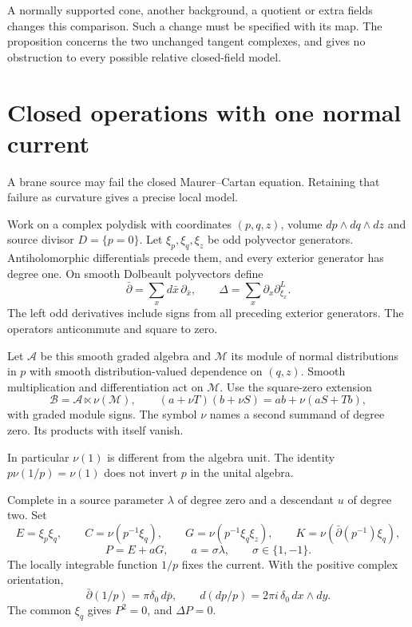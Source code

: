 A normally supported cone, another background, a quotient
or extra fields changes this comparison. Such a change
must be specified with its map. The proposition concerns
the two unchanged tangent complexes, and gives no
obstruction to every possible relative closed-field model.

\section{Closed operations with one normal current}

A brane source may fail the closed Maurer--Cartan equation.
Retaining that failure as curvature gives a precise local
model.

Work on a complex polydisk with coordinates $(p,q,z)$,
volume $dp\wedge dq\wedge dz$ and source divisor $D=\{p=0\}$.
Let $\xi_p,\xi_q,\xi_z$ be odd polyvector generators.
Antiholomorphic differentials precede them, and every
exterior generator has degree one. On smooth Dolbeault
polyvectors define
\[
 \bar\partial=\sum_xd\bar x\,\partial_{\bar x},\qquad
 \Delta=\sum_x\partial_x\partial^L_{\xi_x}.
\]
The left odd derivatives include signs from all preceding
exterior generators. The operators anticommute and square
to zero.

Let $\mathscr A$ be this smooth graded algebra and
$\mathscr M$ its module of normal distributions in $p$
with smooth distribution-valued dependence on $(q,z)$.
Smooth multiplication and differentiation act on $\mathscr M$.
Use the square-zero extension
\[
 \mathscr B=\mathscr A\ltimes\nu(\mathscr M),\qquad
 (a+\nu T)(b+\nu S)=ab+\nu(aS+Tb),
\]
with graded module signs. The symbol $\nu$ names a second
summand of degree zero. Its products with itself vanish.

In particular $\nu(1)$ is different from the algebra unit.
The identity $p\nu(1/p)=\nu(1)$ does not invert $p$ in
the unital algebra.

Complete in a source parameter $\lambda$ of degree zero
and a descendant $u$ of degree two. Set
\[
 E=\xi_p\xi_q,\qquad
 C=\nu(p^{-1}\xi_q),\qquad
 G=\nu(p^{-1}\xi_q\xi_z),\qquad
 K=\nu(\bar\partial(p^{-1})\xi_q),
\]
\[
 P=E+aG,\qquad a=\sigma\lambda,\qquad \sigma\in\{1,-1\}.
\]
The locally integrable function $1/p$ fixes the current.
With the positive complex orientation,
\begin{equation}\label{mht:eq:closed-source-residue}
 \bar\partial(1/p)=\pi\delta_0\,d\bar p,
 \qquad d(dp/p)=2\pi i\,\delta_0\,dx\wedge dy.
\end{equation}
The common $\xi_q$ gives $P^2=0$, and $\Delta P=0$.

